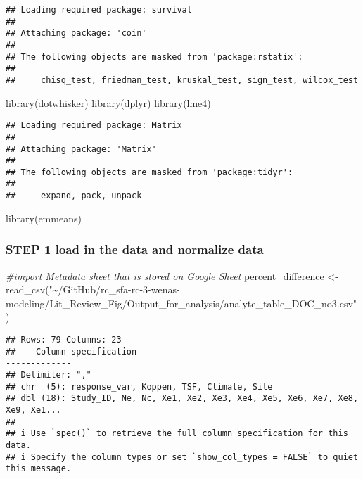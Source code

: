 \documentclass[
]{article}
\newenvironment{Shaded}{\begin{snugshade}}{\end{snugshade}}
\newcommand{\CommentTok}[1]{\textcolor[rgb]{0.56,0.35,0.01}{\textit{#1}}}
\newcommand{\FunctionTok}[1]{\textcolor[rgb]{0.00,0.00,0.00}{#1}}
\newcommand{\NormalTok}[1]{#1}
\newcommand{\OtherTok}[1]{\textcolor[rgb]{0.56,0.35,0.01}{#1}}
\newcommand{\StringTok}[1]{\textcolor[rgb]{0.31,0.60,0.02}{#1}}
\begin{document}
\begin{verbatim}
## Loading required package: survival
## 
## Attaching package: 'coin'
## 
## The following objects are masked from 'package:rstatix':
## 
##     chisq_test, friedman_test, kruskal_test, sign_test, wilcox_test
\end{verbatim}

\begin{Shaded}
\begin{Highlighting}[]
\FunctionTok{library}\NormalTok{(dotwhisker)}
\FunctionTok{library}\NormalTok{(dplyr)}
\FunctionTok{library}\NormalTok{(lme4)}
\end{Highlighting}
\end{Shaded}

\begin{verbatim}
## Loading required package: Matrix
## 
## Attaching package: 'Matrix'
## 
## The following objects are masked from 'package:tidyr':
## 
##     expand, pack, unpack
\end{verbatim}

\begin{Shaded}
\begin{Highlighting}[]
\FunctionTok{library}\NormalTok{(emmeans)}
\end{Highlighting}
\end{Shaded}

\hypertarget{step-1-load-in-the-data-and-normalize-data}{%
\subsubsection{STEP 1 load in the data and normalize
data}\label{step-1-load-in-the-data-and-normalize-data}}

\begin{Shaded}
\begin{Highlighting}[]
\CommentTok{\#import Metadata sheet that is stored on Google Sheet }
\NormalTok{percent\_difference }\OtherTok{\textless{}{-}} \FunctionTok{read\_csv}\NormalTok{(}\StringTok{"\textasciitilde{}/GitHub/rc\_sfa{-}rc{-}3{-}wenas{-}modeling/Lit\_Review\_Fig/Output\_for\_analysis/analyte\_table\_DOC\_no3.csv"}\NormalTok{)}
\end{Highlighting}
\end{Shaded}

\begin{verbatim}
## Rows: 79 Columns: 23
## -- Column specification --------------------------------------------------------
## Delimiter: ","
## chr  (5): response_var, Koppen, TSF, Climate, Site
## dbl (18): Study_ID, Ne, Nc, Xe1, Xe2, Xe3, Xe4, Xe5, Xe6, Xe7, Xe8, Xe9, Xe1...
## 
## i Use `spec()` to retrieve the full column specification for this data.
## i Specify the column types or set `show_col_types = FALSE` to quiet this message.
\end{verbatim}
\end{document}
